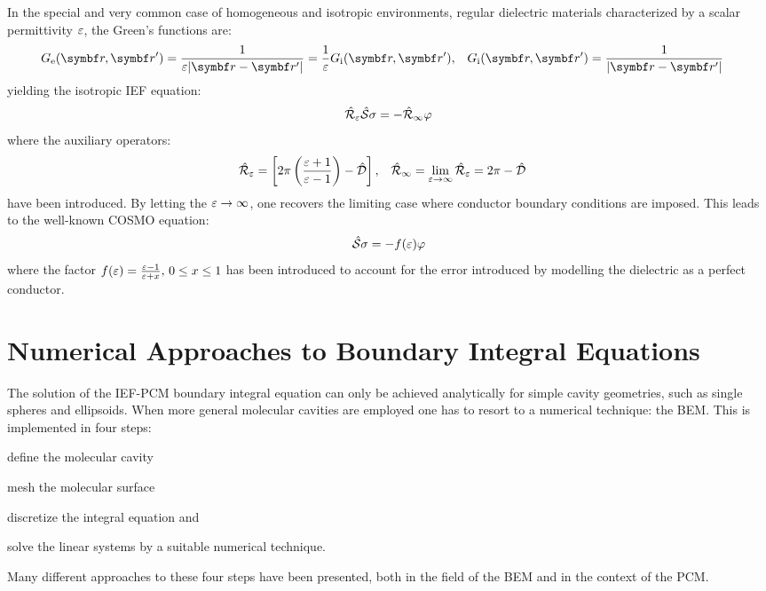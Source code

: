 In the special and very common case of homogeneous and isotropic
environments, \ie regular dielectric materials characterized by a scalar
permittivity $\varepsilon$, the Green's functions are:
\begin{alignat}{2}
  \Ge = \frac{1}{\diel|\vect{r}-\vect{r}^\prime|} = \frac{1}{\diel} \Gi,
  \quad&
  \Gi = \frac{1}{|\vect{r}-\vect{r}^\prime|}
\end{alignat}
yielding the isotropic \acrshort{IEF} equation:
\begin{equation}\label{eq:isotropic-IEF}
  \hat{\mathcal{R}}_\varepsilon\hat{\mathcal{S}}\sigma = - \hat{\mathcal{R}}_\infty\varphi
\end{equation}
where the auxiliary operators:
\begin{alignat}{2}
  \hat{\mathcal{R}}_\varepsilon = \left[
  2\pi \left(\frac{\varepsilon+1}{\varepsilon-1}\right) - \hat{\mathcal{D}}
  \right],
  \quad&
  \hat{\mathcal{R}}_\infty =  \lim_{\varepsilon\rightarrow\infty}\hat{\mathcal{R}}_\varepsilon
  = 2\pi-\hat{\mathcal{D}}
\end{alignat}
have been introduced.
By letting the $\varepsilon\rightarrow\infty$, one recovers the limiting case
where conductor boundary conditions are imposed. This leads to the
well-known \gls{COSMO} equation:~\autocite{Klamt1993-mj, Cossi2003-xe}
\begin{equation}
  \hat{\mathcal{S}}\sigma = - f(\varepsilon)\varphi
\end{equation}
where the factor $f(\varepsilon) = \frac{\varepsilon-1}{\varepsilon+x},\, 0\leq x \leq 1$
has been introduced to account for the error introduced by modelling the
dielectric as a perfect conductor.

\section{Numerical Approaches to Boundary Integral Equations}\label{sec:BEM}

The solution of the \acrshort{IEF}-\acrshort{PCM} boundary integral equation can
only be achieved analytically for simple cavity geometries, such as
single spheres and ellipsoids.
When more general molecular cavities are employed one has to resort to a
numerical technique: the \gls{BEM}. This is implemented in four steps:
\begin{enumerate*}[label={\alph*)},font={\color{PMS1797}}]
    \item define the molecular cavity
    \item mesh the molecular surface \label{item:mesh}
    \item discretize the integral equation \label{item:discretize} and
    \item solve the linear systems by a suitable numerical technique.
\end{enumerate*}
Many different approaches to these four steps have been presented, both
in the field of the \acrshort{BEM} and in the context of the \acrshort{PCM}.

